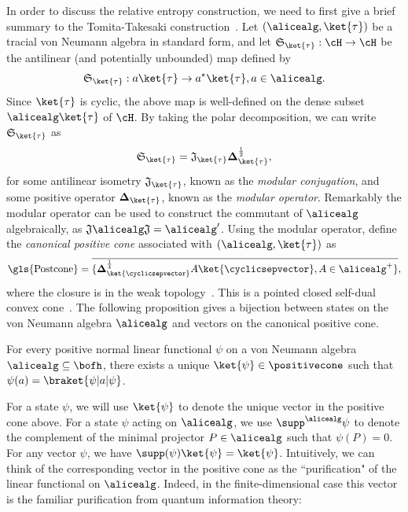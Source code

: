 In order to discuss the relative entropy construction, we need to first give a brief summary to the Tomita-Takesaki construction~\cite{takesakiTomitaTheoryModular1970a}. Let $(\alicealg, \ket{\tau})$ be a tracial von Neumann algebra in standard form, and let $\mathfrak{S}_{\ket{\tau}}: \cH \rightarrow \cH$ be the antilinear (and potentially unbounded) map defined by 
\begin{equation} \label{eq:TT_map}
	\mathfrak{S}_{\ket{\tau}}: a \ket{\tau} \rightarrow a^* \ket{\tau}, a \in \alicealg.
\end{equation}
Since $\ket{\tau}$ is cyclic, the above map is well-defined on the dense subset $\alicealg \ket{\tau}$ of $\cH$. By taking the polar decomposition, we can write $\mathfrak{S}_{\ket{\tau}}$ as
\begin{equation} \label{eq:TT_map_2}
	\mathfrak{S}_{\ket{\tau}} =  \mathfrak{J}_{\ket{\tau}}\mathbf{\Delta}_{\ket{\tau}}^{\frac{1}{2}},
\end{equation}
for some antilinear isometry $\mathfrak{J}_{\ket{\tau}}$, known as the \textit{modular conjugation}, and some positive operator $\mathbf{\Delta}_{\ket{\tau}}$, known as the \textit{modular operator}. Remarkably the modular operator can be used to construct the commutant of $\alicealg$ algebraically, as $\mathfrak{J} \alicealg \mathfrak{J} = \alicealg'$. Using the modular operator, define the \textit{canonical positive cone} associated with $(\alicealg, \ket{\tau})$ as
\begin{equation} \label{eq:positive_cone}
	\text{\gls{Postcone}} = \overline{\{\mathbf{\Delta}_{\ket{\cyclicsepvector}}^{\frac{1}{4}} A \ket{\cyclicsepvector}, A \in \alicealg^{+} \}},
\end{equation}
where the closure is in the weak topology~\cite{arakiPropertiesModularConjugation1974b}. This is a pointed closed self-dual convex cone~\cite[Theorem 4 part 1]{arakiPropertiesModularConjugation1974b}. The following proposition gives a bijection between states on the von Neumann algebra $\alicealg$ and vectors on the canonical positive cone. 
\begin{proposition} \label{prop:state_on_positive_cone}
	For every positive normal linear functional $\psi$ on a von Neumann algebra $\alicealg \subseteq \bofh$, there exists a unique $\ket{\psi} \in \positivecone$ such that $\psi(a) = \braket{\psi|a|\psi}$.
\end{proposition}

For a state $\psi$, we will use $\ket{\psi}$ to denote the unique vector in the positive cone above.  For a state $\psi$ acting on $\alicealg$, we use $\supp^{\alicealg}{\psi}$  to denote the complement of the minimal projector $P \in \alicealg$ such that $\psi(P) = 0$. For any vector $\psi$, we have $\supp(\psi) \ket{\psi} = \ket{\psi}$. Intuitively, we can think of the corresponding vector in the positive cone as the ``purification" of the linear functional on $\alicealg$. Indeed, in the finite-dimensional case this vector is the familiar purification from quantum information theory:

